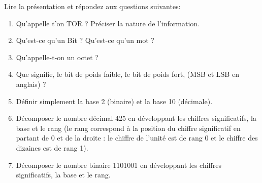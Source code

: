 \documentclass{article}
\begin{document}
Lire la présentation et répondez aux questions suivantes:
\begin{enumerate}
	\item Qu'appelle t'on TOR ? Préciser la nature de l'information.\\
\vspace{1em}
\begin{Form}
	\TextField[name=r1,width=\linewidth,height=2.5em,multiline=true]{}
\end{Form}
	\item Qu'est-ce qu'un Bit ? Qu'est-ce qu'un mot ?\\
\vspace{1em}
\begin{Form}
	\TextField[name=r2,width=\linewidth,height=2.5em,multiline=true]{}
\end{Form}
	\item Qu'appelle-t-on un octet ?\\
\vspace{1em}
\begin{Form}
	\TextField[name=r3,width=\linewidth,height=2.5em,multiline=true]{}
\end{Form}
	\item Que signifie, le bit de poids faible, le bit de poids fort, (MSB et LSB en anglais) ?\\
\vspace{1em}
\begin{Form}
	\TextField[name=r4,width=\linewidth,height=2.5em,multiline=true]{}
\end{Form}
	\item Définir simplement la base 2 (binaire) et la base 10 (décimale).\\
\vspace{1em}
\begin{Form}
	\TextField[name=r5,width=\linewidth,height=2.5em,multiline=true]{}
\end{Form}
	\item Décomposer le nombre décimal 425 en développant les chiffres significatifs, la base et le rang (le
		rang correspond à la position du chiffre significatif en partant de 0 et de la droite : le chiffre de l'unité
		est de rang 0 et le chiffre des dizaines est de rang 1).\\
\vspace{1em}
\begin{Form}
	\TextField[name=r6,width=\linewidth,height=2.5em,multiline=true]{}
\end{Form}
	\item Décomposer le nombre binaire 1101001 en développant les chiffres significatifs, la base et le rang.\\

\end{enumerate}
\end{document}
